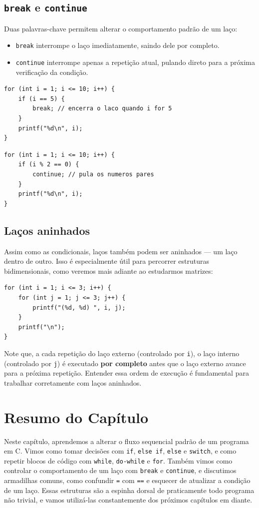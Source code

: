 \documentclass[12pt,a4paper,oneside]{extreport}
\begin{document}
\subsection{\texttt{break} e \texttt{continue}}

Duas palavras-chave permitem alterar o comportamento padrão de um laço:

\begin{itemize}
    \item \texttt{break} interrompe o laço imediatamente, saindo dele por completo.
    \item \texttt{continue} interrompe apenas a repetição atual, pulando direto para a próxima verificação da condição.
\end{itemize}

\begin{lstlisting}
for (int i = 1; i <= 10; i++) {
    if (i == 5) {
        break; // encerra o laco quando i for 5
    }
    printf("%d\n", i);
}
\end{lstlisting}

\begin{lstlisting}
for (int i = 1; i <= 10; i++) {
    if (i % 2 == 0) {
        continue; // pula os numeros pares
    }
    printf("%d\n", i);
}
\end{lstlisting}

\subsection{Laços aninhados}

Assim como as condicionais, laços também podem ser aninhados — um laço dentro de outro. Isso é especialmente útil para percorrer estruturas bidimensionais, como veremos mais adiante ao estudarmos matrizes:

\begin{lstlisting}
for (int i = 1; i <= 3; i++) {
    for (int j = 1; j <= 3; j++) {
        printf("(%d, %d) ", i, j);
    }
    printf("\n");
}
\end{lstlisting}

Note que, a cada repetição do laço externo (controlado por \texttt{i}), o laço interno (controlado por \texttt{j}) é executado \textbf{por completo} antes que o laço externo avance para a próxima repetição. Entender essa ordem de execução é fundamental para trabalhar corretamente com laços aninhados.

\section*{Resumo do Capítulo}
Neste capítulo, aprendemos a alterar o fluxo sequencial padrão de um programa em C. Vimos como tomar decisões com \texttt{if}, \texttt{else if}, \texttt{else} e \texttt{switch}, e como repetir blocos de código com \texttt{while}, \texttt{do-while} e \texttt{for}. Também vimos como controlar o comportamento de um laço com \texttt{break} e \texttt{continue}, e discutimos armadilhas comuns, como confundir \texttt{=} com \texttt{==} e esquecer de atualizar a condição de um laço. Essas estruturas são a espinha dorsal de praticamente todo programa não trivial, e vamos utilizá-las constantemente dos próximos capítulos em diante.
\end{document}
